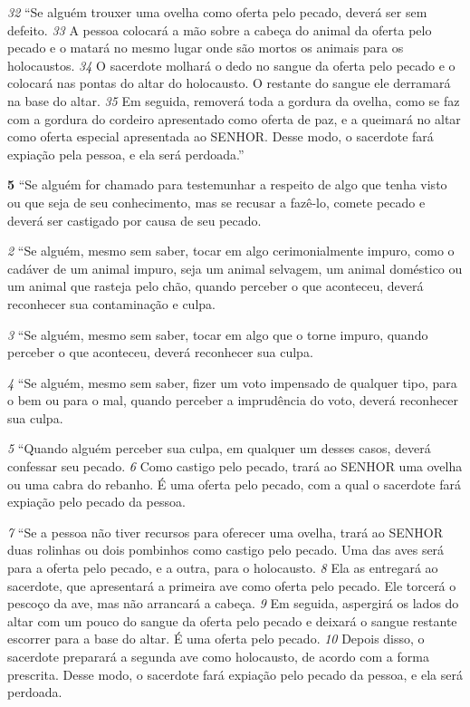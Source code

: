 \smallskip
\textit{\tiny 32}
“Se alguém trouxer uma ovelha como oferta pelo pecado, deverá ser sem
defeito. 
\textit{\tiny 33}
A pessoa colocará a mão sobre a cabeça do animal da oferta pelo
pecado e o matará no mesmo lugar onde são mortos os animais para os
holocaustos. 
\textit{\tiny 34}
O sacerdote molhará o dedo no sangue da oferta pelo pecado e o
colocará nas pontas do altar do holocausto. O restante do sangue ele derramará
na base do altar. 
\textit{\tiny 35}
Em seguida, removerá toda a gordura da ovelha, como se faz
com a gordura do cordeiro apresentado como oferta de paz, e a queimará no altar
como oferta especial apresentada ao SENHOR. Desse modo, o sacerdote fará
expiação pela pessoa, e ela será perdoada.”

\smallskip
\textbf{\large 5} “Se alguém for chamado para testemunhar a respeito de algo que tenha visto
ou que seja de seu conhecimento, mas se recusar a fazê-lo, comete pecado e
deverá ser castigado por causa de seu pecado. 

\smallskip
\textit{\tiny 2} 
“Se alguém, mesmo sem saber, tocar em algo cerimonialmente impuro, como
o cadáver de um animal impuro, seja um animal selvagem, um animal doméstico
ou um animal que rasteja pelo chão, quando perceber o que aconteceu, deverá
reconhecer sua contaminação e culpa. 

\smallskip
\textit{\tiny 3} 
“Se alguém, mesmo sem saber, tocar em algo que o torne impuro, quando
perceber o que aconteceu, deverá reconhecer sua culpa. 

\smallskip
\textit{\tiny 4} 
“Se alguém, mesmo sem saber, fizer um voto impensado de qualquer tipo,
para o bem ou para o mal, quando perceber a imprudência do voto, deverá
reconhecer sua culpa. 

\smallskip
\textit{\tiny 5} 
“Quando alguém perceber sua culpa, em qualquer um desses casos, deverá
confessar seu pecado. 
\textit{\tiny 6} 
Como castigo pelo pecado, trará ao SENHOR uma ovelha ou
uma cabra do rebanho. É uma oferta pelo pecado, com a qual o sacerdote fará
expiação pelo pecado da pessoa. 

\smallskip
\textit{\tiny 7} 
“Se a pessoa não tiver recursos para oferecer uma ovelha, trará ao SENHOR duas
rolinhas ou dois pombinhos como castigo pelo pecado. Uma das aves será para a
oferta pelo pecado, e a outra, para o holocausto. 
\textit{\tiny 8} 
Ela as entregará ao sacerdote,
que apresentará a primeira ave como oferta pelo pecado. Ele torcerá o pescoço da
ave, mas não arrancará a cabeça. 
\textit{\tiny 9} 
Em seguida, aspergirá os lados do altar com um
pouco do sangue da oferta pelo pecado e deixará o sangue restante escorrer para
a base do altar. É uma oferta pelo pecado. 
\textit{\tiny 10}
Depois disso, o sacerdote preparará a
segunda ave como holocausto, de acordo com a forma prescrita. Desse modo, o
sacerdote fará expiação pelo pecado da pessoa, e ela será perdoada.
   
